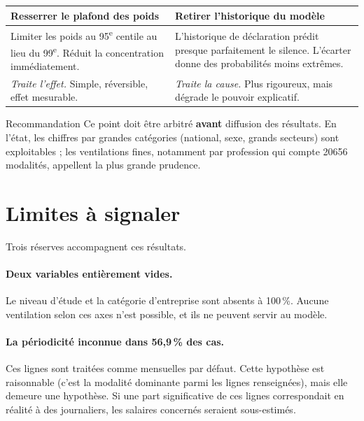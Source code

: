 \documentclass[11pt,a4paper]{article}
\begin{document}
\begin{center}
\begin{tabular}{p{}p{}}
\toprule
\textbf{Resserrer le plafond des poids} & \textbf{Retirer l'historique du modèle} \\
\midrule
Limiter les poids au 95\textsuperscript{e} centile au lieu du
99\textsuperscript{e}. Réduit la concentration immédiatement.
&
L'historique de déclaration prédit presque parfaitement le silence.
L'écarter donne des probabilités moins extrêmes. \\[0.3cm]
\emph{Traite l'effet.} Simple, réversible, effet mesurable.
&
\emph{Traite la cause.} Plus rigoureux, mais dégrade le pouvoir explicatif. \\
\bottomrule
\end{tabular}
\end{center}

\begin{alerte}{Recommandation}
Ce point doit être arbitré \textbf{avant} diffusion des résultats. En
l'état, les chiffres par grandes catégories (national, sexe, grands
secteurs) sont exploitables ; les ventilations fines, notamment par
profession qui compte \num{20656} modalités, appellent la plus grande
prudence.
\end{alerte}

\section{Limites à signaler}

Trois réserves accompagnent ces résultats.

\paragraph{Deux variables entièrement vides.} Le niveau d'étude et la
catégorie d'entreprise sont absents à 100\,\%. Aucune ventilation selon
ces axes n'est possible, et ils ne peuvent servir au modèle.

\paragraph{La périodicité inconnue dans 56,9\,\% des cas.} Ces lignes sont
traitées comme mensuelles par défaut. Cette hypothèse est raisonnable
(c'est la modalité dominante parmi les lignes renseignées), mais elle
demeure une hypothèse. Si une part significative de ces lignes
correspondait en réalité à des journaliers, les salaires concernés
seraient sous-estimés.
\end{document}
